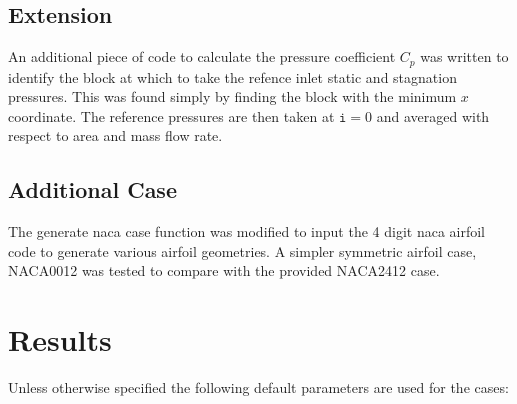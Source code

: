 \documentclass{article}
\begin{document}
\subsection{Extension}

An additional piece of code to calculate the pressure coefficient $C_p$ was written to identify the block at which to take the refence inlet static and stagnation pressures.
This was found simply by finding the block with the minimum $x$ coordinate.
The reference pressures are then taken at $\texttt{i}=0$ and averaged with respect to area and mass flow rate.

\subsection{Additional Case}
The generate naca case function was modified to input the 4 digit naca airfoil code to generate various airfoil geometries.
A simpler symmetric airfoil case, NACA0012 was tested to compare with the provided NACA2412 case.


\section{Results}

Unless otherwise specified the following default parameters are used for the cases:
\end{document}
